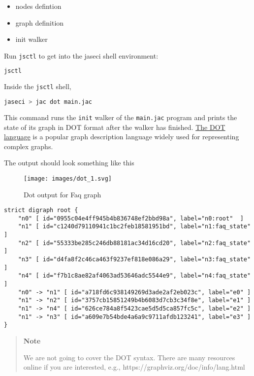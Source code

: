 \begin{itemize}
\tightlist
\item
  nodes defintion
\item
  graph definition
\item
  init walker
\end{itemize}

Run \lstinline!jsctl! to get into the jaseci shell environment:

\begin{lstlisting}[language=bash]
jsctl
\end{lstlisting}

Inside the \lstinline!jsctl! shell,

\begin{lstlisting}[language=bash]
jaseci > jac dot main.jac
\end{lstlisting}

This command runs the \lstinline!init! walker of the
\lstinline!main.jac! program and prints the state of its graph in DOT
format after the walker has finished.
\href{https://graphviz.org/doc/info/lang.html}{The DOT language} is a
popular graph description language widely used for representing complex
graphs.

The output should look something like this

\begin{figure}
\centering
\texttt{[image: images/dot\_1.svg]}
\caption{Dot output for Faq graph}
\end{figure}

\begin{lstlisting}
strict digraph root {
    "n0" [ id="0955c04e4ff945b4b836748ef2bbd98a", label="n0:root"  ]
    "n1" [ id="c1240d79110941c1bc2feb18581951bd", label="n1:faq_state"  ]
    "n2" [ id="55333be285c246db88181ac34d16cd20", label="n2:faq_state"  ]
    "n3" [ id="d4fa8f2c46ca463f9237ef818e086a29", label="n3:faq_state"  ]
    "n4" [ id="f7b1c8ae82af4063ad53646adc5544e9", label="n4:faq_state"  ]
    "n0" -> "n1" [ id="a718fd6c938149269d3ade2af2eb023c", label="e0" ]
    "n1" -> "n2" [ id="3757cb15851249b4b6083d7cb3c34f8e", label="e1" ]
    "n1" -> "n4" [ id="626ce784a8f5423cae5d5d5ca857fc5c", label="e2" ]
    "n1" -> "n3" [ id="a609e7b54bde4a6a9c9711afdb123241", label="e3" ]
}
\end{lstlisting}

\begin{quote}
\textbf{Note}

We are not going to cover the DOT syntax. There are many resources
online if you are interested, e.g.,
https://graphviz.org/doc/info/lang.html
\end{quote}

